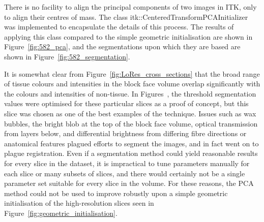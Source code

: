  There is no facility to align the principal components of two images in ITK, only to align their centres of mass. The class itk::CenteredTransformPCAInitializer was implemented to encapsulate the details of this process. The results of applying this class compared to the simple geometric initialisation are shown in Figure~\ref{fig:582_pca}, and the segmentations upon which they are based are shown in Figure~\ref{fig:582_segmentation}.

  It is somewhat clear from Figure~\ref{fig:LoRes_cross_sections} that the broad range of tissue colours and intensities in the block face volume overlap significantly with the colours and intensities of non-tissue. In Figures~, the threshold segmentation values were optimised for these particular slices as a proof of concept, but this slice was chosen as one of the best examples of the technique. Issues such as wax bubbles, the bright blob at the top of the block face volume, optical transmission from layers below, and differential brightness from differing fibre directions or anatomical features plagued efforts to segment the images, and in fact went on to plague registration. Even if a segmentation method could yield reasonable results for every slice in the dataset, it is impractical to tune parameters manually for each slice or many subsets of slices, and there would certainly not be a single parameter set suitable for every slice in the volume. For these reasons, the PCA method could not be used to improve robustly upon a simple geometric initialisation of the high-resolution slices seen in Figure~\ref{fig:geometric_initialisation}.

